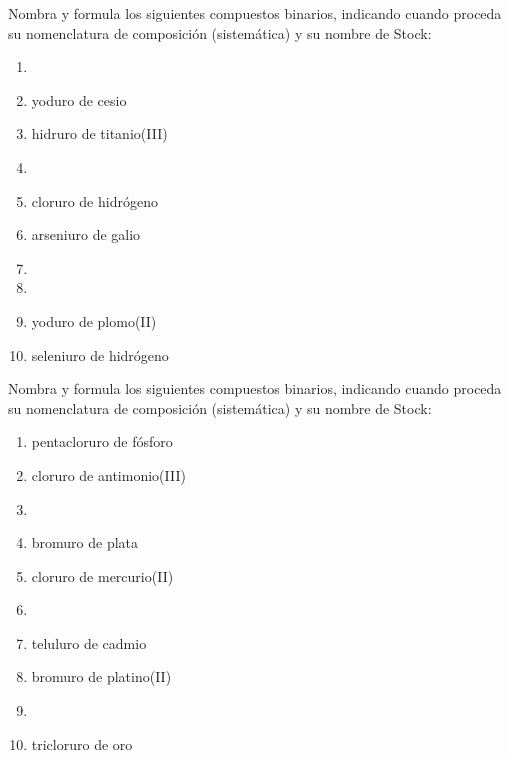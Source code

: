 \documentclass[10pt]{article}
\begin{document}
\begin{exercise}[
    tags    = {inorgánica,compuestos binarios,sales,hidruros},
    topics  = {química inorgánica,formulación,nomenclatura},
    source  = {SAN Formulación, p26, e28},
  ]
  Nombra y formula los siguientes compuestos binarios, indicando cuando proceda su nomenclatura de composición (sistemática) y su nombre de Stock:

  \begin{enumerate}
    \item {}
    \item yoduro de cesio
    \item hidruro de titanio(III)
    \item {}
    \item cloruro de hidrógeno
    \item arseniuro de galio
    \item {}
    \item {}
    \item yoduro de plomo(II)
    \item seleniuro de hidrógeno
  \end{enumerate}
\end{exercise}

\begin{exercise}[
    tags    = {inorgánica,compuestos binarios,sales},
    topics  = {química inorgánica,formulación,nomenclatura},
    source  = {SAN Formulación, p26, e29},
  ]

  Nombra y formula los siguientes compuestos binarios, indicando cuando proceda su nomenclatura de composición (sistemática) y su nombre de Stock:

  \begin{enumerate}
    \item pentacloruro de fósforo
    \item cloruro de antimonio(III)
    \item {}
    \item bromuro de plata
    \item cloruro de mercurio(II)
    \item {}
    \item teluluro de cadmio
    \item bromuro de platino(II)
    \item {}
    \item tricloruro de oro
  \end{enumerate}
\end{exercise}
\end{document}
